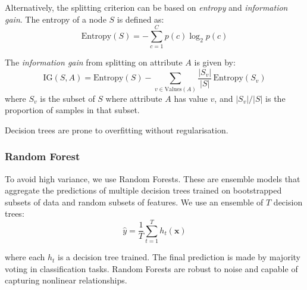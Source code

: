 \documentclass[conference]{IEEEtran}
\begin{document}
Alternatively, the splitting criterion can be based on \textit{entropy} and \textit{information gain}. The entropy of a node $S$ is defined as:
\begin{equation}
    \text{Entropy}(S) = -\sum_{c=1}^{C} p(c) \log_2 p(c)
    \label{eq:entropy}
\end{equation}

The \textit{information gain} from splitting on attribute $A$ is given by:
\begin{equation}
    \text{IG}(S, A) = \text{Entropy}(S) - \sum_{v \in \text{Values}(A)} \frac{|S_v|}{|S|} \, \text{Entropy}(S_v)
    \label{eq:infogain}
\end{equation}
where $S_v$ is the subset of $S$ where attribute $A$ has value $v$, and $|S_v|/|S|$ is the proportion of samples in that subset.

Decision trees are prone to overfitting without regularisation.

\subsubsection{Random Forest}
To avoid high variance, we use Random Forests. These are ensemble models that aggregate the predictions of multiple decision trees trained on bootstrapped subsets of data and random subsets of features. We use an ensemble of $T$ decision trees:
\begin{equation}
    \hat{y} = \frac{1}{T} \sum_{t=1}^{T} h_t(\mathbf{x})
\end{equation}

where each $h_t$ is a decision tree trained. The final prediction is made by majority voting in classification tasks. Random Forests are robust to noise and capable of capturing nonlinear relationships.
\end{document}
